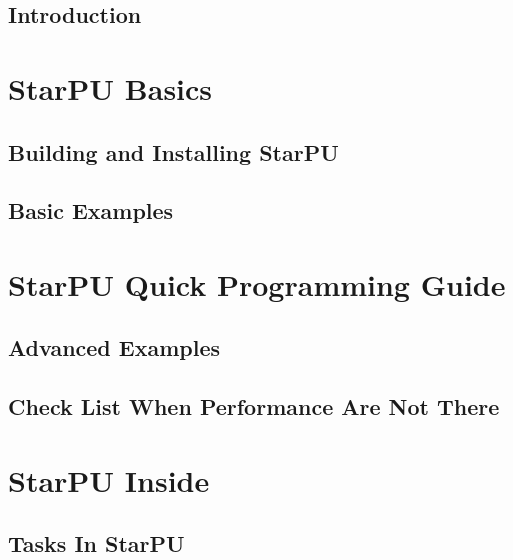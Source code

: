\setcounter{tocdepth}{2}
\tableofcontents
{}
\hypersetup{pageanchor=true,citecolor=blue}

\chapter{Introduction}
\label{index}
\hypertarget{index}{}


\part{StarPU Basics}

\chapter{Building and Installing StarPU}
\label{BuildingAndInstallingStarPU}
\hypertarget{BuildingAndInstallingStarPU}{}


\chapter{Basic Examples}
\label{BasicExamples}
\hypertarget{BasicExamples}{}


\part{StarPU Quick Programming Guide}

\chapter{Advanced Examples}
\label{AdvancedExamples}
\hypertarget{AdvancedExamples}{}


\chapter{Check List When Performance Are Not There}
\label{CheckListWhenPerformanceAreNotThere}
\hypertarget{CheckListWhenPerformanceAreNotThere}{}


\part{StarPU Inside}

\chapter{Tasks In StarPU}
\label{TasksInStarPU}
\hypertarget{TasksInStarPU}{}


